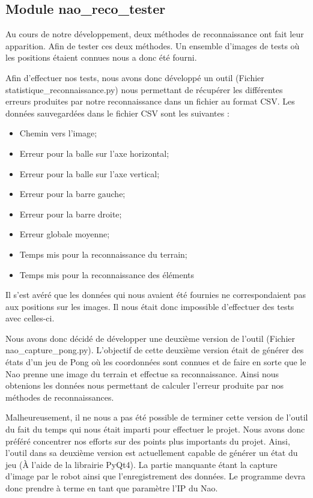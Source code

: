 \subsection{Module nao\_reco\_tester}
\label{sub:Module nao_reco_tester}
\par Au cours de notre développement, deux méthodes de reconnaissance ont fait leur apparition. Afin
de tester ces deux méthodes. Un ensemble d'images de tests où les positions étaient connues nous a donc
été fourni.

\par Afin d'effectuer nos tests, nous avons donc développé un outil (Fichier statistique\_reconnaissance.py)
nous permettant de récupérer les différentes erreurs produites par notre reconnaissance dans un fichier au format
CSV. Les données sauvegardées dans le fichier CSV sont les suivantes :

\begin{itemize}
    \item Chemin vers l'image;
    \item Erreur pour la balle sur l'axe horizontal;
    \item Erreur pour la balle sur l'axe vertical;
    \item Erreur pour la barre gauche;
    \item Erreur pour la barre droite;
    \item Erreur globale moyenne;
    \item Temps mis pour la reconnaissance du terrain;
    \item Temps mis pour la reconnaissance des éléments
\end{itemize}

\par Il s'est avéré que les données qui nous avaient été fournies ne correspondaient pas aux positions sur les images.
Il nous était donc impossible d'effectuer des tests avec celles-ci.

\par Nous avons donc décidé de développer une deuxième version de l'outil (Fichier nao\_capture\_pong.py). L'objectif
de cette deuxième version était de générer des états d'un jeu de Pong où les coordonnées sont connues et de faire en
sorte que le Nao prenne une image du terrain et effectue sa reconnaissance. Ainsi nous obtenions les données nous
permettant de calculer l'erreur produite par nos méthodes de reconnaissances.

\par Malheureusement, il ne nous a pas été possible de terminer cette version de l'outil du fait du temps qui nous était
imparti pour effectuer le projet. Nous avons donc préféré concentrer nos efforts sur des points plus importants du
projet. Ainsi, l'outil dans sa deuxième version est actuellement capable de générer un état du jeu
(À l'aide de la librairie PyQt4).
La partie manquante étant la capture d'image par le robot ainsi que l'enregistrement des données. Le programme devra donc prendre à terme
en tant que paramètre l'IP du Nao.

